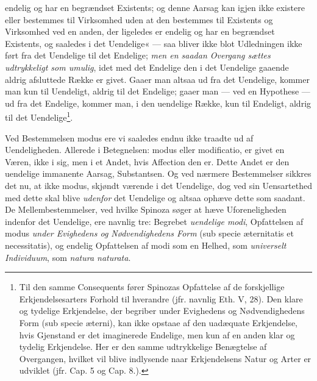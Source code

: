 \documentclass[12pt,a4paper]{book}
\newcommand{\opage}[1]{\marginnote{\footnotesize\textit{[#1]}}}
\begin{document}
endelig og har en begrændset Existents; og denne Aarsag kan igjen
ikke existere eller bestemmes til Virksomhed uden at den bestemmes
til Existents og Virksomhed ved en anden, der ligeledes er endelig og
har en begrændset Existents, og saaledes i det Uendelige« --- saa
bliver ikke blot Udledningen ikke ført fra det Uendelige til det
Endelige; \emph{men en saadan Overgang sættes udtrykkeligt som
umulig}, idet med det Endelige den i det Uendelige gaaende aldrig
afsluttede Række er givet. Gaaer man altsaa ud fra det Uendelige,
kommer man kun til Uendeligt, aldrig til det Endelige; gaaer man ---
ved en Hypothese --- ud fra det Endelige, kommer man, i den uendelige
Række, kun til Endeligt, aldrig til det
Uendelige\footnote{Til den samme Consequents fører Spinozas
Opfattelse af de forskjellige Erkjendelsesarters Forhold til
hverandre (jfr. navnlig Eth. V, 28). Den klare og tydelige
Erkjendelse, der begriber under Evighedens og Nødvendighedens Form
(sub specie æterni), kan ikke opstaae af den uadæquate Erkjendelse,
hvis Gjenstand er det imaginerede Endelige, men kun af en anden klar
og tydelig Erkjendelse. Her er den samme udtrykkelige Benægtelse af
Overgangen, hvilket vil blive indlysende naar Erkjendelsens Natur og
Arter er udviklet (jfr. Cap. 5 og Cap. 8.).}.

Ved Bestemmelsen modus ere vi saaledes endnu ikke traadte ud af
Uendeligheden. Allerede i Betegnelsen: modus eller modificatio, er
givet en Væren, ikke i sig, men i et Andet, hvis Affection den er.
Dette Andet er den uendelige immanente Aarsag, Substantsen. Og ved
nærmere
\opage{60} \setcounter{footnote}{0}%
Bestemmelser sikkres det nu, at ikke modus, skjøndt værende i det
Uendelige, dog ved sin Uensartethed med dette skal blive \emph{udenfor} det
Uendelige og altsaa ophæve dette som saadant. De Mellembestemmelser,
ved hvilke Spinoza søger at hæve Uforeneligheden indenfor det
Uendelige, ere navnlig tre: Begrebet \emph{uendelige modi},
Opfattelsen af modus \emph{under Evighedens og Nødvendighedens Form} (sub
specie æternitatis et necessitatis), og endelig Opfattelsen af modi
som en Helhed, som \emph{universelt Individuum}, som \emph{natura
naturata}.
\end{document}
